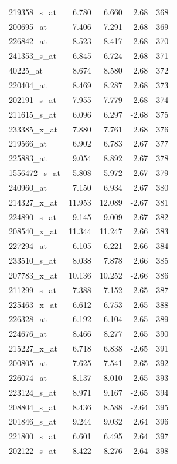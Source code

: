 \begin{footnotesize}
\begin{longtable}{lrrrr}
219358\_s\_at & 6.780 & 6.660 & 2.68 & 368 \\
200695\_at & 7.406 & 7.291 & 2.68 & 369 \\
226842\_at & 8.523 & 8.417 & 2.68 & 370 \\
241353\_s\_at & 6.845 & 6.724 & 2.68 & 371 \\
40225\_at & 8.674 & 8.580 & 2.68 & 372 \\
220404\_at & 8.469 & 8.287 & 2.68 & 373 \\
202191\_s\_at & 7.955 & 7.779 & 2.68 & 374 \\
211615\_s\_at & 6.096 & 6.297 & -2.68 & 375 \\
233385\_x\_at & 7.880 & 7.761 & 2.68 & 376 \\
219566\_at & 6.902 & 6.783 & 2.67 & 377 \\
225883\_at & 9.054 & 8.892 & 2.67 & 378 \\
1556472\_s\_at & 5.808 & 5.972 & -2.67 & 379 \\
240960\_at & 7.150 & 6.934 & 2.67 & 380 \\
214327\_x\_at & 11.953 & 12.089 & -2.67 & 381 \\
224890\_s\_at & 9.145 & 9.009 & 2.67 & 382 \\
208540\_x\_at & 11.344 & 11.247 & 2.66 & 383 \\
227294\_at & 6.105 & 6.221 & -2.66 & 384 \\
233510\_s\_at & 8.038 & 7.878 & 2.66 & 385 \\
207783\_x\_at & 10.136 & 10.252 & -2.66 & 386 \\
211299\_s\_at & 7.388 & 7.152 & 2.65 & 387 \\
225463\_x\_at & 6.612 & 6.753 & -2.65 & 388 \\
226328\_at & 6.192 & 6.104 & 2.65 & 389 \\
224676\_at & 8.466 & 8.277 & 2.65 & 390 \\
215227\_x\_at & 6.718 & 6.838 & -2.65 & 391 \\
200805\_at & 7.625 & 7.541 & 2.65 & 392 \\
226074\_at & 8.137 & 8.010 & 2.65 & 393 \\
223124\_s\_at & 8.971 & 9.167 & -2.65 & 394 \\
208804\_s\_at & 8.436 & 8.588 & -2.64 & 395 \\
201846\_s\_at & 9.244 & 9.032 & 2.64 & 396 \\
221800\_s\_at & 6.601 & 6.495 & 2.64 & 397 \\
202122\_s\_at & 8.422 & 8.276 & 2.64 & 398 \\

\end{longtable}
\end{footnotesize}
